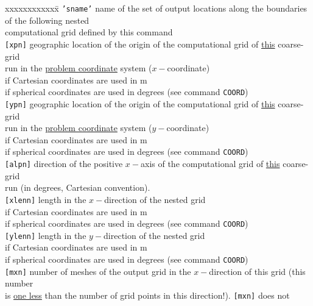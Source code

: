 \documentclass[12pt]{book}
\begin{document}
\begin{tabbing}
 xxxxxxxxxxxx\= \kill
{\tt {'sname'}}   \> name of the set of output locations along the boundaries of the following nested\+\\
                     computational grid defined by this command\-\\
{\tt [xpn]}       \> geographic location of the origin of the computational grid of \underline{this} coarse-grid\+\\
                     run in the \underline{problem coordinate} system ($x-$coordinate)\\
                     if Cartesian coordinates are used in m\\
                     if spherical coordinates are used in degrees (see command {\tt COORD})\-\\
{\tt [ypn]}       \> geographic location of the origin of the computational grid of \underline{this} coarse-grid\+\\
                     run in the \underline{problem coordinate} system ($y-$coordinate)\\
                     if Cartesian coordinates are used in m\\
                     if spherical coordinates are used in degrees (see command {\tt COORD})\-\\
{\tt [alpn]}      \> direction of the positive $x-$axis of the computational grid of \underline{this} coarse-grid\+\\
                     run (in degrees, Cartesian convention).\-\\
{\tt [xlenn]}     \> length in the $x-$direction of the nested grid\+\\
                     if Cartesian coordinates are used in m\\
                     if spherical coordinates are used in degrees (see command {\tt COORD})\-\\
{\tt [ylenn]}     \> length in the $y-$direction of the nested grid\+\\
                     if Cartesian coordinates are used in m\\
                     if spherical coordinates are used in degrees (see command {\tt COORD})\-\\
{\tt [mxn]}       \> number of meshes of the output grid in the $x-$direction of this grid (this number\+\\
                     is \underline{one less} than the number of grid points in this direction!). {\tt [mxn]} does not\\

\end{tabbing}
\end{document}
